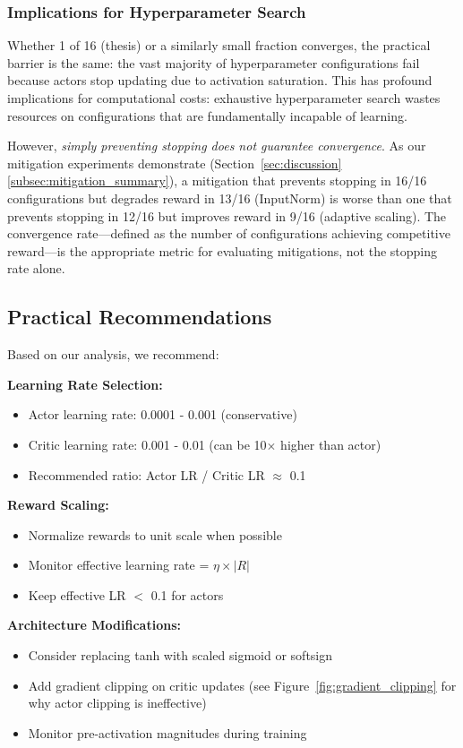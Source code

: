 \subsubsection{Implications for Hyperparameter Search}

Whether 1 of 16 (thesis) or a similarly small fraction converges, the practical barrier is the same: the vast majority of hyperparameter configurations fail because actors stop updating due to activation saturation. This has profound implications for computational costs: exhaustive hyperparameter search wastes resources on configurations that are fundamentally incapable of learning.

However, \textit{simply preventing stopping does not guarantee convergence}. As our mitigation experiments demonstrate (Section~\ref{sec:discussion}\ref{subsec:mitigation_summary}), a mitigation that prevents stopping in 16/16 configurations but degrades reward in 13/16 (InputNorm) is worse than one that prevents stopping in 12/16 but improves reward in 9/16 (adaptive scaling). The convergence rate---defined as the number of configurations achieving competitive reward---is the appropriate metric for evaluating mitigations, not the stopping rate alone.

\subsection{Practical Recommendations}

Based on our analysis, we recommend:

\textbf{Learning Rate Selection:}
\begin{itemize}
    \item Actor learning rate: 0.0001 - 0.001 (conservative)
    \item Critic learning rate: 0.001 - 0.01 (can be 10$\times$ higher than actor)
    \item Recommended ratio: Actor LR / Critic LR $\approx$ 0.1
\end{itemize}

\textbf{Reward Scaling:}
\begin{itemize}
    \item Normalize rewards to unit scale when possible
    \item Monitor effective learning rate = $\eta \times |R|$
    \item Keep effective LR $<$ 0.1 for actors
\end{itemize}

\textbf{Architecture Modifications:}
\begin{itemize}
    \item Consider replacing tanh with scaled sigmoid or softsign
    \item Add gradient clipping on critic updates (see Figure~\ref{fig:gradient_clipping} for why actor clipping is ineffective)
    \item Monitor pre-activation magnitudes during training
\end{itemize}

